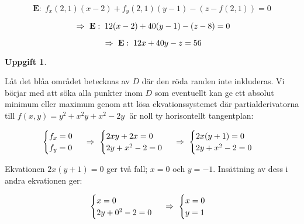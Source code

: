 \documentclass{article}
\newtheorem{thr}{Uppgift}
\begin{document}
\vskip 0.2cm

$$
\mathbf{E}:\; f_{x}(2, 1)(x-2)+f_{y}(2, 1)(y-1)-(z-f(2, 1))=0
$$

$$
\ \Rightarrow \ 
\mathbf{E}:\; 12(x-2)+40(y-1)-(z-8)=0
$$

$$
\ \Rightarrow \ 
\mathbf{E}:\; 12x+40y-z=56
$$

\newpage

\begin{thr}
\end{thr}

\begin{figure}[h]
    \center
\end{figure}

Låt det blåa området betecknas av $D$ där den röda randen inte inkluderas. Vi börjar med att söka alla punkter inom $D$ som eventuellt kan ge ett absolut minimum eller maximum genom att lösa ekvationssystemet där partialderivatorna till $f(x, y)=y^2+x^2y+x^2-2y\;$ är noll ty horisontellt tangentplan:

$$
\begin{cases}
    f_{x}=0 \\
    f_{y}=0 
\end{cases}
\ \Rightarrow \ 
\begin{cases}
    2xy+2x=0 \\
    2y+x^2-2=0
\end{cases}
\ \Rightarrow \ 
\begin{cases}
    2x(y+1)=0 \\
    2y+x^2-2=0
\end{cases}
$$

\vskip 0.2cm

Ekvationen $2x(y+1)=0$ ger två fall; $x=0$ och $y=-1$. Insättning av dess i andra ekvationen ger:

$$
\begin{cases}
    x=0 \\
    2y+0^2-2=0
\end{cases}
\ \Rightarrow \ 
\begin{cases}
    x=0 \\
    y=1
\end{cases}
$$
\end{document}
